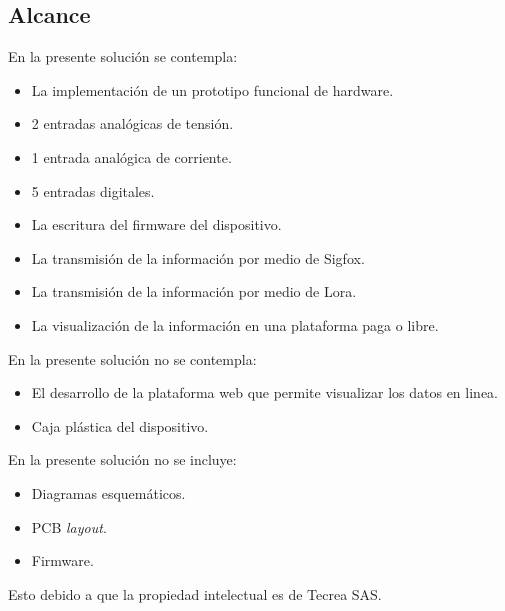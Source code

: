 \subsection{Alcance}

En la presente solución se contempla:


\begin{itemize}
	\item La implementación de un prototipo funcional de hardware.
	\item 2 entradas analógicas de tensión.
	\item 1 entrada analógica de corriente.
	\item 5 entradas digitales.
	\item La escritura del firmware del dispositivo.
	\item La transmisión de la información por medio de Sigfox.
	\item La transmisión de la información por medio de Lora.
	\item La visualización de la información en una plataforma paga o libre.
\end{itemize}
En la presente solución no se contempla:
\begin{itemize}
	\item El desarrollo de la plataforma web que permite visualizar los datos en linea.
	\item Caja plástica del dispositivo.
\end{itemize}
En la presente solución no se incluye:
\begin{itemize}
	\item Diagramas esquemáticos.
	\item PCB \textit{layout}.
	\item Firmware.
\end{itemize}

Esto debido a que la propiedad intelectual es de Tecrea SAS.



